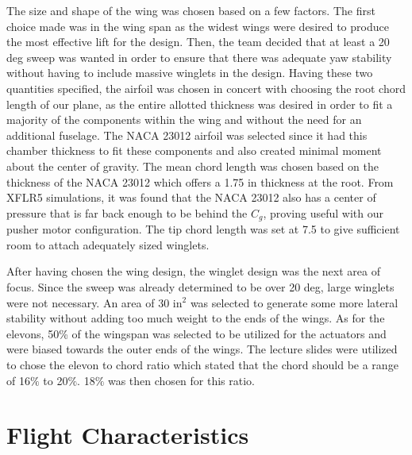     The size and shape of the wing was chosen based on a few factors. The first choice made was in the wing span as the widest wings were desired to produce the most effective lift for the design. Then, the team decided that at least a 20 deg sweep was wanted in order to ensure that there was adequate yaw stability without having to include massive winglets in the design. Having these two quantities specified, the airfoil was chosen in concert with choosing the root chord length of our plane, as the entire allotted thickness was desired in order to fit a majority of the components within the wing and without the need for an additional fuselage. The NACA 23012 airfoil was selected since it had this chamber thickness to fit these components and also created minimal moment about the center of gravity. The mean chord length was chosen based on the thickness of the NACA 23012 which offers a 1.75 in thickness at the root. From XFLR5 simulations, it was found that the NACA 23012 also has a center of pressure that is far back enough to be behind the $C_g$, proving useful with our pusher motor configuration. The tip chord length was set at 7.5 to give sufficient room to attach adequately sized winglets. 

    After having chosen the wing design, the winglet design was the next area of focus. Since the sweep was already determined to be over 20 deg, large winglets were not necessary. An area of 30 $\text{in}^2$ was selected to generate some more lateral stability without adding too much weight to the ends of the wings. As for the elevons, 50\% of the wingspan was selected to be utilized for the actuators and were biased towards the outer ends of the wings. The lecture slides were utilized to chose the elevon to chord ratio which stated that the chord should be a range of 16$\%$ to 20$\%$. 18$\%$ was then chosen for this ratio.


\section{Flight Characteristics}

